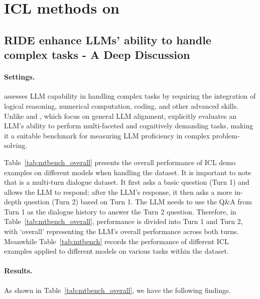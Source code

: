 \section{ICL methods on \mtbench{}}
\label{append:mt_bench_all}


\subsection{RIDE enhance LLMs’ ability to handle complex tasks - A Deep Discussion}
\label{appendix:mtbench_dicsuss}

\paragraph{Settings.} \mtbench{} assesses LLM capability in handling complex tasks by requiring the integration of logical reasoning, numerical computation, coding, and other advanced skills. Unlike \alpaca{} and \dataname{}, which focus on general LLM alignment, \mtbench{} explicitly evaluates an LLM’s ability to perform multi-faceted and cognitively demanding tasks, making it a suitable benchmark for measuring LLM proficiency in complex problem-solving.

Table~\ref{tab:mtbench_overall} presents the overall performance of ICL demo examples on different models when handling the \mtbench{} dataset. It is important to note that \mtbench{} is a multi-turn dialogue dataset. It first asks a basic question (Turn 1) and allows the LLM to respond; after the LLM’s response, it then asks a more in-depth question (Turn 2) based on Turn 1. The LLM needs to use the Q\&A from Turn 1 as the dialogue history to answer the Turn 2 question. Therefore, in Table~\ref{tab:mtbench_overall}, performance is divided into Turn 1 and Turn 2, with ‘overall’ representing the LLM’s overall performance across both turns. Meanwhile Table~\ref{tab:mtbench} records the performance of different ICL examples applied to different models on various tasks within the \mtbench{} dataset.

\paragraph{Results.} As shown in Table~\ref{tab:mtbench_overall}, we have the following findings.

